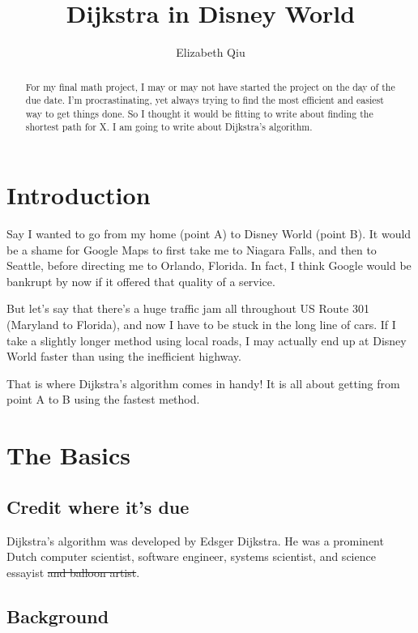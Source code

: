 \documentclass{article}
\title{Dijkstra in Disney World}
\author{Elizabeth Qiu}
\begin{document}
\maketitle

\begin{abstract}
For my final math project, I may or may not have started the project on the day of the due date. I'm procrastinating, yet always trying to find the most efficient and easiest way to get things done. So I thought it would be fitting to write about finding the shortest path for X. I am going to write about Dijkstra's algorithm.
\end{abstract}

\section{Introduction}

Say I wanted to go from my home (point A) to Disney World (point B). It would be a shame for Google Maps to first take me to Niagara Falls, and then to Seattle, before directing me to Orlando, Florida. In fact, I think Google would be bankrupt by now if it offered that quality of a service.

But let's say that there's a huge traffic jam all throughout US Route 301 (Maryland to Florida), and now I have to be stuck in the long line of cars. If I take a slightly longer method using local roads, I may actually end up at Disney World faster than using the inefficient highway.

That is where Dijkstra's algorithm comes in handy! It is all about getting from point A to B using the fastest method.

\section{The Basics}

\subsection{Credit where it's due}

Dijkstra's algorithm was developed by Edsger Dijkstra. He was a prominent Dutch computer scientist, software engineer, systems scientist, and science essayist \sout{and balloon artist}.

\subsection{Background}
\end{document}
